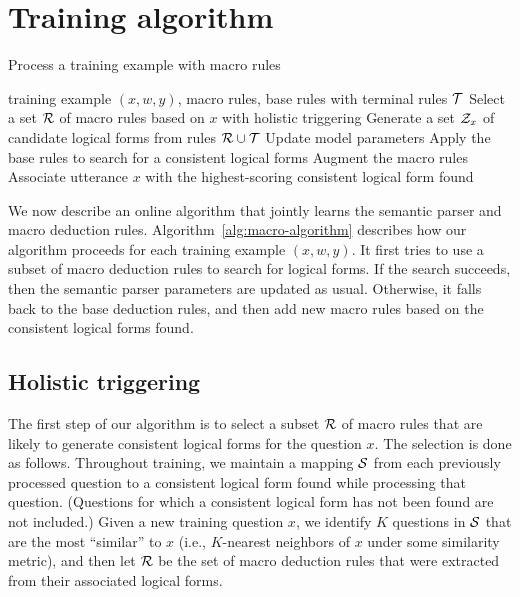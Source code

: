 \section{Training algorithm}

\begin{algorithm}[t]
\caption{Process a training example with macro rules}
\label{alg:macro-algorithm}
\begin{algorithmic}[1]
\Require training example $(x, w, y)$, macro rules,
base rules with terminal rules $\mathcal{T}$
\State Select a set $\mathcal{R}$ of macro rules based on $x$ with holistic triggering
\State Generate a set $\mathcal{Z}_x$ of candidate logical forms
from rules $\mathcal{R} \cup \mathcal{T}$
\State Update model parameters
\Else
\State Apply the base rules to search for a consistent
logical forms
\State Augment the macro rules
\EndIf
\State Associate utterance $x$ with the highest-scoring
consistent logical form found
\end{algorithmic}
\end{algorithm}

We now describe an online algorithm
that jointly learns the semantic parser
and macro deduction rules.
Algorithm~\ref{alg:macro-algorithm}
describes how our algorithm proceeds
for each training example $(x, w, y)$.
It first tries to use a subset of macro deduction rules
to search for logical forms.
If the search succeeds,
then the semantic parser parameters are updated as usual.
Otherwise, it falls back to the base deduction rules,
and then add new macro rules based on the
consistent logical forms found.

\subsection{Holistic triggering}
\label{sec:macro-trigger}

The first step of our algorithm is to
select a subset $\mathcal{R}$ of macro rules
that are likely to generate consistent logical forms
for the question $x$.
The selection is done as follows.
Throughout training,
we maintain a mapping $\mathcal{S}$
from each previously processed question
to a consistent logical form found while processing that question.
(Questions for which
a consistent logical form has not been found
are not included.)
Given a new training question $x$,
we identify $K$ questions in $\mathcal{S}$
that are the most ``similar'' to $x$
(i.e., $K$-nearest neighbors of $x$ under some similarity metric),
and then let $\mathcal{R}$
be the set of macro deduction rules that
were extracted from their associated logical forms.

